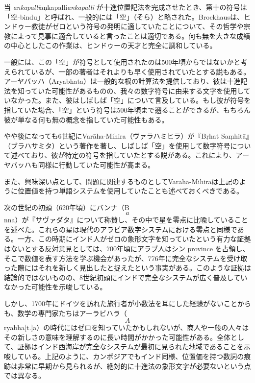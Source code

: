 \documentclass[a4paper,11pt,openany]{ltjsbook}
\begin{document}
当 \textit{ankapalli}aṇkapalli\textit{ankapalli} が十進位置記法を完成させたとき、第十の符号は「空-bindu」と呼ばれ、一般的には「空」（そら）と略された。Brockhausは、ヒンドゥー教徒がゼロという符号の発明に適していたことについて、その哲学や宗教によって見事に適合していると言ったことは適切である。何も無を大きな成績の中心としたこの作業は、ヒンドゥーの天才と完全に調和している。

一般には、この「空」が符号として使用されたのは500年頃からではないかと考えられているが、一部の著者はそれよりも早く使用されていたとする説もある。アーヤバッハ（Aryabhata）は一般的な根の計算法を提供しており、彼は十進記法を知っていた可能性があるものの、我々の数字符号に由来する文字を使用していなかった。また、彼はしばしば「空」について言及している。もし彼が符号を指していた場合、「空」という符号は500年頃まで遡ることができるが、もちろん彼が単なる何も無の概念を指していた可能性もある。

やや後になっても6世紀にVarāha-Mihira（ヴァラハミヒラ）が『Bṛhat Saṃhitā』（ブラハサミタ）という著作を著し、しばしば「空」を使用して数字符号について述べており、彼が特定の符号を指していたとする説がある。これにより、アーヤバッハも同様に行動していた可能性が高まる。

また、興味深い点として、問題に関連するものとしてVarāha-Mihiraは上記のように位置値を持つ単語システムを使用していたことも述べておくべきである。

次の世紀の初頭（620年頃）にバンナ（B\[a\]nna）が『サヴァダタ』について称賛し、その中で星を零点に比喩していることを述べた。これらの星は現代のアラビア数字システムにおける零点と同様である。一方、この時期にインド人がゼロの象形文字を知っていたという有力な証拠はないとする反対意見としては、700年頃にアラブ人はシン province を占領し、そこで数値を表す方法を学ぶ機会があったが、776年に完全なシステムを受け取った際にはそれを新しく見出したと捉えたという事実がある。このような証拠は結論的ではないものの、8世紀初頭にインドで完全なシステムが広く普及していなかった可能性を示唆している。

しかし、1700年にドイツを訪れた旅行者が小数法を耳にした経験がないことからも、数学の専門家たちはアーラビハラ（\[A\]ryabha[t.]a）の時代にはゼロを知っていたかもしれないが、商人や一般の人々はその新しさの意味を理解するのに長い時間がかかった可能性がある。全体として、証拠はインド西海岸が完全なシステムが最初に見られた地域であることを示唆している。上記のように、カンボジアでもインド同様、位置価を持つ数詞の痕跡は非常に早期から見られるが、絶対的に十進法の象形文字が必要ないという点では異なる。
\end{document}

